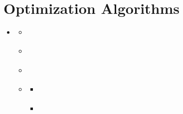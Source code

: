 \documentclass[letterpaper,10pt,english]{sphinxmanual}
\begin{document}
\chapter{Optimization Algorithms}
\label{\detokenize{operationsResearch/optimizationAlgorithms:optimization-algorithms}}\label{\detokenize{operationsResearch/optimizationAlgorithms::doc}}
\begin{sphinxShadowBox}
\begin{itemize}
\item {} 
\sphinxAtStartPar
{}\label{\detokenize{operationsResearch/optimizationAlgorithms:id4}}{\hyperref[\detokenize{operationsResearch/optimizationAlgorithms:optimization-algorithms}]{}}
\begin{itemize}
\item {} 
\sphinxAtStartPar
{}\label{\detokenize{operationsResearch/optimizationAlgorithms:id5}}{\hyperref[\detokenize{operationsResearch/optimizationAlgorithms:the-simplex-method}]{}}

\item {} 
\sphinxAtStartPar
{}\label{\detokenize{operationsResearch/optimizationAlgorithms:id6}}{\hyperref[\detokenize{operationsResearch/optimizationAlgorithms:the-branch-and-bound-algorithm}]{}}

\item {} 
\sphinxAtStartPar
{}\label{\detokenize{operationsResearch/optimizationAlgorithms:id7}}{\hyperref[\detokenize{operationsResearch/optimizationAlgorithms:gradient-descent-and-newton-s-method}]{}}

\item {} 
\sphinxAtStartPar
{}\label{\detokenize{operationsResearch/optimizationAlgorithms:id8}}{\hyperref[\detokenize{operationsResearch/optimizationAlgorithms:examples}]{}}
\begin{itemize}
\item {} 
\sphinxAtStartPar
{}\label{\detokenize{operationsResearch/optimizationAlgorithms:id9}}{\hyperref[\detokenize{operationsResearch/optimizationAlgorithms:machine-scheduling-problem}]{}}

\item {} 
\sphinxAtStartPar
{}\label{\detokenize{operationsResearch/optimizationAlgorithms:id10}}{\hyperref[\detokenize{operationsResearch/optimizationAlgorithms:facility-location-problem}]{}}

\end{itemize}

\end{itemize}

\end{itemize}
\end{sphinxShadowBox}
\end{document}
